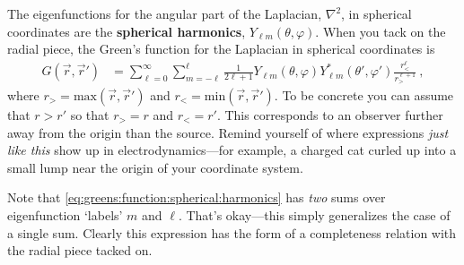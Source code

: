 \begin{example}
The eigenfunctions for the angular part of the Laplacian, $\nabla^2$, in spherical coordinates are the \textbf{spherical harmonics}, $Y_{\ell m}(\theta, \varphi)$. When you tack on the radial piece, the Green's function for the Laplacian in spherical coordinates is
\begin{align}
  G(\vec{r},\vec{r}')
  &=
  \sum_{\ell=0}^\infty
  \sum_{m=-\ell}^\ell
  \frac{1}{2\ell+1}
  Y_{\ell m}(\theta, \varphi)
  Y_{\ell m}^*(\theta', \varphi')
  \frac{r_<^\ell}{r_>^{\ell+1}} \ ,
  \label{eq:greens:function:spherical:harmonics}
\end{align}
where $r_> = \text{max}(\vec{r},\vec{r}')$ and $r_< = \text{min}(\vec{r},\vec{r}')$. To be concrete you can assume that $r > r'$ so that $r_> = r$ and $r_< = r'$. This corresponds to an observer further away from the origin than the source. Remind yourself of where expressions \emph{just like this} show up in electrodynamics---for example, a charged cat curled up into a small lump near the origin of your coordinate system.

Note that \eqref{eq:greens:function:spherical:harmonics} has \emph{two} sums over eigenfunction `labels' $m$ and $\ell$. That's okay---this simply generalizes the case of a single sum. Clearly this expression has the form of a completeness relation with the radial piece tacked on.


\end{example}
